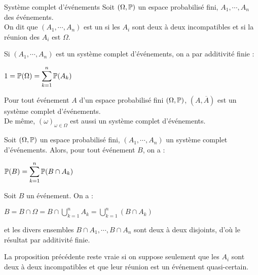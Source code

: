 \documentclass[12pt,a4paper]{report}
\begin{document}

\begin{definition}{Système complet d'événements}{}
Soit $(\Omega,\mathbb{P})$ un espace probabilisé fini, $A_1,\cdots,A_n$ des événements. \\
On dit que $(A_1,\cdots,A_n)$ est un  si les $A_i$ sont deux à deux incompatibles et si la réunion des $A_i$ est $\Omega$.
\end{definition}

\begin{remarque}{}
Si $(A_1,\cdots,A_n)$ est un système complet d'événements, on a par additivité finie :
\begin{center}
$1 = \mathbb{P}(\Omega) = \displaystyle \sum_{k=1}^n \mathbb{P}(A_k)$
\end{center}
\end{remarque}

\begin{exemple}{}
Pour tout événement $A$ d'un espace probabilisé fini $(\Omega,\mathbb{P})$, $(A, \overline{A})$ est un système complet d'événements.\\ 
De même, $({\omega})_{\omega \in \Omega}$ est aussi un système complet d'événements.
\end{exemple}

\begin{proposition}{}{}
Soit $(\Omega,\mathbb{P})$ un espace probabilisé fini, $(A_1,\cdots,A_n)$ un système complet d'événements. Alors, pour tout événement $B$, on a :
\begin{center}
$\mathbb{P}(B) = \displaystyle \sum_{k=1}^n \mathbb{P}(B \cap A_k)$
\end{center}
\end{proposition}

\begin{demo}{}
Soit $B$ un événement. On a :
\begin{center}
$B = B \cap \Omega = B \cap \displaystyle \bigcup_{k=1}^n A_k = \bigcup_{k=1}^n (B \cap A_k)$
\end{center}

et les divers ensembles $B \cap A_1,\cdots,B\cap A_n$ sont deux à deux disjoints, d'où le résultat par additivité finie.
\end{demo}

\begin{exemple}[Exercice 1]{}
La proposition précédente reste vraie si on suppose seulement que les $A_i$ sont deux à deux incompatibles et que leur réunion est un événement quasi-certain.
\end{exemple}
\end{document}
